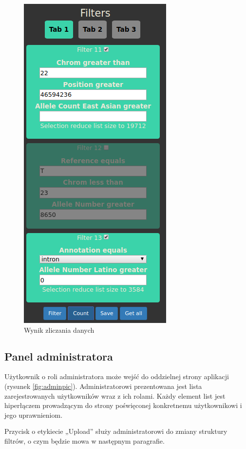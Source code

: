 \documentclass[a4paper,12pt,twoside]{article}
\begin{document}
\begin{figure}[H]
\centering
\includegraphics[height=0.95\textheight]{obrazy/aplikacja/count.png}
\caption{Wynik zliczania danych}
\label{fig:countpic}
\end{figure}

\subsection{Panel administratora}
Użytkownik o roli administratora może wejść do oddzielnej strony aplikacji (rysunek \ref{fig:adminpic}). Administratorowi prezentowana jest lista zarejestrowanych użytkowników wraz z ich rolami. Każdy element list jest hiperłączem prowadzącym
do strony poświęconej konkretnemu użytkownikowi i jego uprawnieniom.

Przycisk o etykiecie „Upload” służy administratorowi do zmiany struktury
filtrów, o czym będzie mowa w następnym paragrafie.
\end{document}
